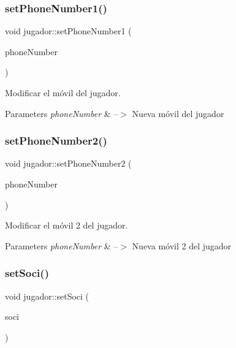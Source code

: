 \subsubsection{\texorpdfstring{set\+Phone\+Number1()}{setPhoneNumber1()}}
{\footnotesize\ttfamily void jugador\+::set\+Phone\+Number1 (\begin{DoxyParamCaption}\item[{Q\+String}]{phone\+Number }\end{DoxyParamCaption})}



Modificar el móvil del jugador. 


\begin{DoxyParams}{Parameters}
{\em phone\+Number} & --$>$ Nueva móvil del jugador \\
\hline
\end{DoxyParams}
\mbox{\label{classjugador_a7541a8d0d7df4c5cc1fc49b15cd24da3}} 
\subsubsection{\texorpdfstring{set\+Phone\+Number2()}{setPhoneNumber2()}}
{\footnotesize\ttfamily void jugador\+::set\+Phone\+Number2 (\begin{DoxyParamCaption}\item[{Q\+String}]{phone\+Number }\end{DoxyParamCaption})}



Modificar el móvil 2 del jugador. 


\begin{DoxyParams}{Parameters}
{\em phone\+Number} & --$>$ Nueva móvil 2 del jugador \\
\hline
\end{DoxyParams}
\mbox{\label{classjugador_a684e5c98a3c39214b93923615d1a2fb2}} 
\subsubsection{\texorpdfstring{set\+Soci()}{setSoci()}}
{\footnotesize\ttfamily void jugador\+::set\+Soci (\begin{DoxyParamCaption}\item[{Q\+String}]{soci }\end{DoxyParamCaption})}



